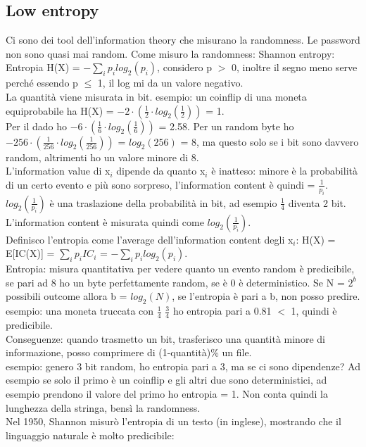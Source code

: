 \documentclass[16px]{article}
\begin{document}
\subsection{Low entropy}
Ci sono dei tool dell'information theory che misurano la randomness. Le password non sono quasi mai random. Come misuro la randomness: Shannon entropy:
Entropia H(X) = $-\sum\limits_{i}p_{i}log_{2}(p_{i})$, considero p $>$ 0, inoltre il segno meno serve perché essendo p $\leq$ 1, il log mi da un valore negativo.\\ La quantità viene misurata in bit. esempio: un coinflip di una moneta equiprobabile ha H(X) = $-2 \cdot (\frac{1}{2} \cdot log_{2}(\frac{1}{2}))$ = 1.\\ Per il dado ho $-6 \cdot (\frac{1}{6} \cdot log_{2}(\frac{1}{6}))$ = 2.58. Per un random byte ho $-256 \cdot (\frac{1}{256} \cdot log_{2}(\frac{1}{256}))$ = $log_{2}(256)$ = 8, ma questo solo se i bit sono davvero random, altrimenti ho un valore minore di 8.\\ L'information value di x$_{i}$ dipende da quanto x$_{i}$ è inatteso: minore è la probabilità di un certo evento e più sono sorpreso, l'information content è quindi = $\frac{1}{p_{i}}$.\\ $log_{2}(\frac{1}{p_{i}})$ è una traslazione della probabilità in bit, ad esempio $\frac{1}{4}$ diventa 2 bit. L'information content è misurata quindi come $log_{2}(\frac{1}{p_{i}})$.\\ Definisco l'entropia come l'average dell'information content degli x$_{i}$: H(X) = E[IC(X)] = $\sum\limits_{i}p_{i}IC_{i}$ = $-\sum\limits_{i}p_{i}log_{2}(p_{i})$.\\ Entropia: misura quantitativa per vedere quanto un evento random è predicibile, se pari ad 8 ho un byte perfettamente random, se è 0 è deterministico. Se N = $2^b$ possibili outcome allora b = $log_{2}(N)$, se l'entropia è pari a b, non posso predire. esempio: una moneta truccata con $\frac{1}{4}$ $\frac{3}{4}$ ho entropia pari a 0.81 $<$ 1, quindi è predicibile.\\ Conseguenze: quando trasmetto un bit, trasferisco una quantità minore di informazione, posso comprimere di (1-quantità)\% un file.\\
esempio: genero 3 bit random, ho entropia pari a 3, ma se ci sono dipendenze? Ad esempio se solo il primo è un coinflip e gli altri due sono deterministici, ad esempio prendono il valore del primo ho entropia = 1. Non conta quindi la lunghezza della stringa, bensì la randomness.\\ Nel 1950, Shannon misurò l'entropia di un testo (in inglese), mostrando che il linguaggio naturale è molto predicibile:\\
\end{document}
